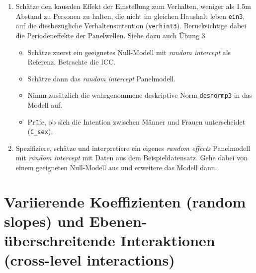 \documentclass[
]{book}
\providecommand{\tightlist}{%
  \setlength{\itemsep}{0pt}\setlength{\parskip}{0pt}}
\begin{document}
\begin{enumerate}
\def\labelenumi{\arabic{enumi})}
\tightlist
\item
  Schätze den kausalen Effekt der Einstellung zum Verhalten, weniger als 1.5m Abstand zu Personen zu halten, die nicht im gleichen Haushalt leben \texttt{ein3}, auf die diesbezügliche Verhaltensintention (\texttt{verhint3}). Berücksichtige dabei die Periodeneffekte der Panelwellen. Siehe dazu auch Übung 3.

  \begin{itemize}
  \tightlist
  \item
    Schätze zuerst ein geeignetes Null-Modell mit \emph{random intercept} als Referenz. Betrachte die ICC.
  \item
    Schätze dann das \emph{random intercept} Panelmodell.
  \item
    Nimm zusätzlich die wahrgenommene deskriptive Norm \texttt{desnormp3} in das Modell auf.
  \item
    Prüfe, ob sich die Intention zwischen Männer und Frauen unterscheidet (\texttt{C\_sex}).
  \end{itemize}
\item
  Spezifiziere, schätze und interpretiere ein eigenes \emph{random effects} Panelmodell mit \emph{random intercept} mit Daten aus dem Beispieldatensatz. Gehe dabei von einem geeigneten Null-Modell aus und erweitere das Modell dann.
\end{enumerate}

\hypertarget{variierende-koeffizienten-random-slopes-und-ebenen-uxfcberschreitende-interaktionen-cross-level-interactions}{%
\section{Variierende Koeffizienten (random slopes) und Ebenen-überschreitende Interaktionen (cross-level interactions)}\label{variierende-koeffizienten-random-slopes-und-ebenen-uxfcberschreitende-interaktionen-cross-level-interactions}}
\end{document}
